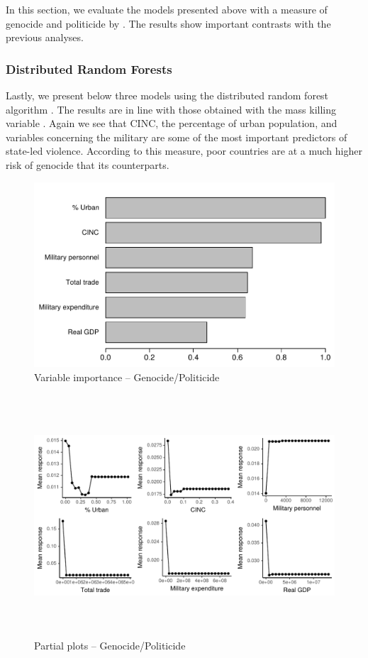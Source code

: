 In this section, we evaluate the models presented above with a measure of genocide and politicide by \citet{harff2003no}. The results show important contrasts with the previous analyses. 

\newpage
\subsubsection{Distributed Random Forests}

Lastly, we present below three models using the distributed random forest algorithm \citep{h2o2017}. The results are in line with those obtained with the mass killing variable \citep{ulfelder2008assessing}. Again we see that CINC, the percentage of urban population, and variables concerning the military are some of the most important predictors of state-led violence. According to this measure, poor countries are at a much higher risk of genocide that its counterparts.

\begin{figure}[H]
    \centering
    \includegraphics{images/drf-gp.pdf}
    \caption{Variable importance -- Genocide/Politicide}
    \label{fig:my_label}
\end{figure}

\begin{figure}[H]
    \centering
    \includegraphics[width=\textwidth, height=9cm]{images/drfdpp4a.pdf}
    \caption{Partial plots -- Genocide/Politicide}
    \label{fig:my_label}
\end{figure}

